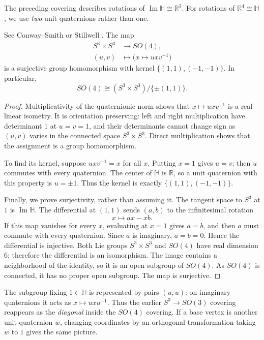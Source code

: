 The preceding covering describes rotations of
$\operatorname{Im}\mathbb H\cong\mathbb R^3$.
For rotations of $\mathbb R^4\cong\mathbb H$,
we use \emph{two} unit quaternions rather
than one.

\begin{proposition}
\label{proposition-quaternionic-cover-so4}
See Conway--Smith \cite[Section~4.2]{conway-smith-quaternions}
or Stillwell \cite[Sections~2.5--2.7]{stillwell-naive-lie}.
The map
\[
\begin{aligned}
S^3\times S^3&\longrightarrow SO(4),\\
(u,v)&\longmapsto
\bigl(x\longmapsto uxv^{-1}\bigr)
\end{aligned}
\]
is a surjective group homomorphism with
kernel $\{(1,1),(-1,-1)\}$. In particular,
\[
SO(4)\cong
(S^3\times S^3)/\{\pm(1,1)\}.
\]
\end{proposition}

\begin{proof}
Multiplicativity of the quaternionic norm shows that
$x\mapsto uxv^{-1}$ is a real-linear isometry.  It is
orientation preserving: left and right multiplication have
determinant $1$ at $u=v=1$, and their determinants cannot
change sign as $(u,v)$ varies in the connected space
$S^3\times S^3$.  Direct multiplication shows that the
assignment is a group homomorphism.

To find its kernel, suppose $uxv^{-1}=x$ for all $x$.
Putting $x=1$ gives $u=v$; then $u$ commutes with every
quaternion.  The center of $\mathbb H$ is $\mathbb R$, so
a unit quaternion with this property is $u=\pm1$.
Thus the kernel is exactly $\{(1,1),(-1,-1)\}$.

Finally, we prove surjectivity, rather than assuming it.
The tangent space to $S^3$ at $1$ is
$\operatorname{Im}\mathbb H$.  The differential at $(1,1)$
sends $(a,b)$ to the infinitesimal rotation
\[
 x\longmapsto ax-xb.
\]
If this map vanishes for every $x$, evaluating at $x=1$
gives $a=b$, and then $a$ must commute with every
quaternion.  Since $a$ is imaginary, $a=b=0$.
Hence the differential is injective.  Both Lie groups
$S^3\times S^3$ and $SO(4)$ have real dimension $6$;
therefore the differential is an isomorphism.  The image
contains a neighborhood of the identity, so it is an
open subgroup of $SO(4)$.  As $SO(4)$ is connected,
it has no proper open subgroup.  The map is surjective.
\end{proof}

\begin{remark}
\label{remark-so3-diagonal-inside-so4}
The subgroup fixing $1\in\mathbb H$ is
represented by pairs $(u,u)$: on imaginary
quaternions it acts as
$x\mapsto uxu^{-1}$. Thus the earlier
$S^3\to SO(3)$ covering reappears as the
\emph{diagonal} inside the $SO(4)$
covering. If a base vertex is another
unit quaternion $w$, changing coordinates
by an orthogonal transformation taking
$w$ to $1$ gives the same picture.
\end{remark}

